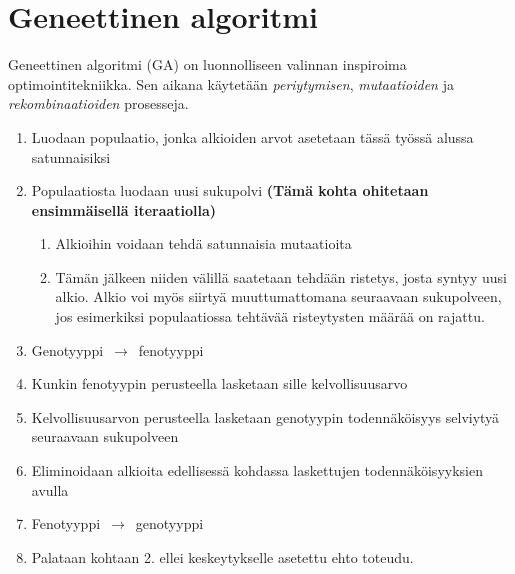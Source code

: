 \section{Geneettinen algoritmi}

Geneettinen algoritmi (GA) on luonnolliseen valinnan inspiroima optimointitekniikka.
Sen aikana käytetään \textit{periytymisen}, \textit{mutaatioiden} ja \textit{rekombinaatioiden}
prosesseja.

\begin{enumerate}
	\item Luodaan populaatio, jonka alkioiden arvot asetetaan tässä työssä alussa satunnaisiksi
	\item Populaatiosta luodaan uusi sukupolvi \textbf{(Tämä kohta ohitetaan ensimmäisellä iteraatiolla)}
	\begin{enumerate}
		\item Alkioihin voidaan tehdä satunnaisia mutaatioita
		\item Tämän jälkeen niiden välillä saatetaan tehdään ristetys, josta syntyy uusi alkio.
		Alkio voi myös siirtyä muuttumattomana seuraavaan sukupolveen, jos esimerkiksi
		populaatiossa tehtävää risteytysten määrää on rajattu.
	\end{enumerate}
	\item Genotyyppi~\(\rightarrow\)~fenotyyppi
	\item	Kunkin fenotyypin perusteella lasketaan sille kelvollisuusarvo
	\item Kelvollisuusarvon perusteella lasketaan genotyypin todennäköisyys selviytyä seuraavaan sukupolveen
	\item Eliminoidaan alkioita edellisessä kohdassa laskettujen todennäköisyyksien avulla
	\item Fenotyyppi~\(\rightarrow\)~genotyyppi
	\item Palataan kohtaan 2. ellei keskeytykselle asetettu ehto toteudu.
\end{enumerate}
